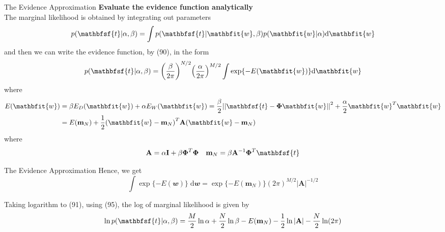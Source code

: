 \documentclass{bredelebeamer}
\begin{document}
\begin{frame}{The Evidence Approximation}
  \textbf{Evaluate the evidence function analytically} \\
  The marginal likelihood is obtained by integrating out parameters
  \begin{equation}
    p(\mathbfsf{t}|\alpha,\beta) = \int p(\mathbfsf{t}|\mathbfit{w},\beta) p(\mathbfit{w}|\alpha) \mathrm{d}\mathbfit{w}
  \end{equation}
  and then we can write the evidence function, by (90), in the form
  \begin{equation}
    p(\mathbfsf{t}|\alpha, \beta)
    =
    {\left(\frac{\beta}{2\pi}\right)}^{N/2}
    {\left(\frac{\alpha}{2\pi}\right)}^{M/2}
    \int \exp \{ - E(\mathbfit{w})\} \mathrm{d}\mathbfit{w}
  \end{equation}
  where
  \begin{equation}
    \begin{split}
      E(\mathbfit{w}) &= \beta E_{D}(\mathbfit{w}) + \alpha E_{W}(\mathbfit{w})
      = \frac{\beta}{2} {||\mathbfsf{t}-\boldsymbol{\Phi}\mathbfit{w}||}^2 + \frac{\alpha}{2} \mathbfit{w}^T \mathbfit{w} \\
      &= E(\mathbf{m}_N) + \frac{1}{2} {(\mathbfit{w} - \mathbf{m}_N)}^T \mathbf{A} (\mathbfit{w} - \mathbf{m}_N)
    \end{split}
  \end{equation}
  where
  \begin{equation}
      \mathbf{A} = \alpha \mathbf{I} + \beta \boldsymbol{\Phi}^T \boldsymbol{\Phi} \quad
      \mathbf{m}_N = \beta \mathbf{A}^{-1} \boldsymbol{\Phi}^T \mathbfsf{t}
  \end{equation}
\end{frame}

\begin{frame}{The Evidence Approximation}
  Hence, we get
  \begin{equation}
    \int \exp{\{ - E(\mathbfit{w}) \}} \; \mathrm{d}\mathbfit{w} = \exp{\{ -E(\mathbf{m}_N) \}} {(2\pi)}^{M/2} |\mathbf{A}|^{-1/2}
  \end{equation}

  Taking logarithm to (91), using (95), the log of marginal likelihood is given by
  \begin{equation}
    \ln p(\mathbfsf{t}|\alpha,\beta)
    = \frac{M}{2}\ln \alpha
    + \frac{N}{2}\ln \beta
    - E(\mathbf{m}_N)
    - \frac{1}{2} \ln |\mathbf{A}|
    - \frac{N}{2} \ln(2\pi)
  \end{equation}
\end{frame}
\end{document}
